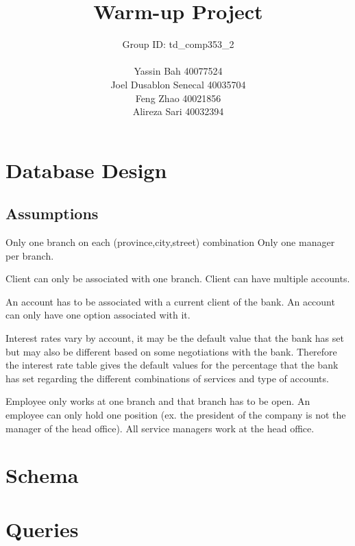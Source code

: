 \documentclass[letterpaper, 12pt]{article}
\title{
  Warm-up Project
  \vspace*{5em}
}
\author{
  Group ID: td\_comp353\_2\\\\
  Yassin Bah 40077524\\
  Joel Dusablon Senecal 40035704\\
  Feng Zhao 40021856\\
  Alireza Sari 40032394 \vspace*{3em}
}
\begin{document}
\maketitle
\newpage

\section{Database Design}

\subsection{Assumptions}
Only one branch on each (province,city,street) combination
Only one manager per branch.

Client can only be associated with one branch.
Client can have multiple accounts.

An account has to be associated with a current client of the bank.
An account can only have one option associated with it.

Interest rates vary by account, it may be the default value that the bank has set but may also be different based on some negotiations with the bank.
Therefore the interest rate table gives the default values for the percentage that the bank has set regarding the different combinations of services and type of accounts.

Employee only works at one branch and that branch has to be open.
An employee can only hold one position (ex. the president of the company is not the manager of the head office).
All service managers work at the head office.

\section{Schema}

\begin{figure}[ht]
  
\end{figure}

\begin{figure}[ht]
  
\end{figure}
\section{Queries}




\end{document}
